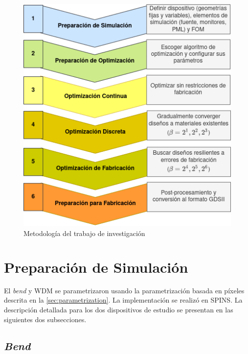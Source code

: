 \begin{figure}[ht]
  \centering
  \includegraphics[width=\textwidth]{image/proposal/pipeline.png}
  \caption{Metodología del trabajo de investigación}
  \label{fig:pipeline}
\end{figure}

\section{Preparación de Simulación}\label{sec:preparar-simulacion}

El \emph{bend} y WDM se parametrizaron usando la parametrización basada en píxeles descrita en la
\autoref{sec:parametrization}.
La implementación se realizó en SPINS.
La descripción detallada para los dos dispositivos de estudio se presentan en las siguientes dos subsecciones.

\subsection{\emph{Bend}}

